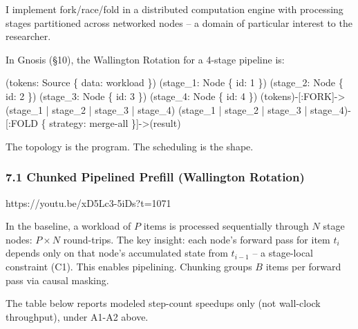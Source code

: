 \documentclass[
  11pt,
]{article}
\newenvironment{Shaded}{}{}
\newcommand{\NormalTok}[1]{#1}
\begin{document}
I implement fork/race/fold in a distributed computation engine with
processing stages partitioned across networked nodes -- a domain of
particular interest to the researcher.

In Gnosis (§10), the Wallington Rotation for a 4-stage pipeline is:

\begin{Shaded}
\begin{Highlighting}[]
\NormalTok{(tokens: Source \{ data: \textquotesingle{}workload\textquotesingle{} \})}
\NormalTok{(stage\_1: Node \{ id: \textquotesingle{}1\textquotesingle{} \})}
\NormalTok{(stage\_2: Node \{ id: \textquotesingle{}2\textquotesingle{} \})}
\NormalTok{(stage\_3: Node \{ id: \textquotesingle{}3\textquotesingle{} \})}
\NormalTok{(stage\_4: Node \{ id: \textquotesingle{}4\textquotesingle{} \})}
\NormalTok{(tokens){-}[:FORK]{-}\textgreater{}(stage\_1 | stage\_2 | stage\_3 | stage\_4)}
\NormalTok{(stage\_1 | stage\_2 | stage\_3 | stage\_4){-}[:FOLD \{ strategy: \textquotesingle{}merge{-}all\textquotesingle{} \}]{-}\textgreater{}(result)}
\end{Highlighting}
\end{Shaded}

The topology is the program. The scheduling is the shape.

\subsubsection{7.1 Chunked Pipelined Prefill (Wallington
Rotation)}\label{chunked-pipelined-prefill-wallington-rotation}

https://youtu.be/xD5Lc3-5iDs?t=1071

In the baseline, a workload of \(P\) items is processed sequentially
through \(N\) stage nodes: \(P \times N\) round-trips. The key insight:
each node's forward pass for item \(t_i\) depends only on that node's
accumulated state from \(t_{i-1}\) -- a stage-local constraint (C1).
This enables pipelining. Chunking groups \(B\) items per forward pass
via causal masking.

The table below reports modeled step-count speedups only (not wall-clock
throughput), under A1-A2 above.
\end{document}
